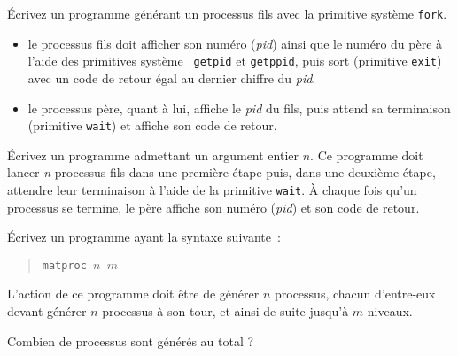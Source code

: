 %


% 


\question

Écrivez un programme générant un processus fils avec la primitive
système {\tt fork}.

\begin {itemize}
    \item le processus fils doit afficher son numéro ({\em pid}) ainsi
	que le numéro du père à l'aide des primitives système {\tt
	getpid} et {\tt getppid}, puis sort (primitive {\tt exit}) avec
	un code de retour égal au dernier chiffre du {\em pid}.

    \item le processus père, quant à lui, affiche le {\em pid} du fils,
	puis attend sa terminaison (primitive {\tt wait}) et affiche son
	code de retour.

\end {itemize}


\question

Écrivez un programme admettant un argument entier $n$. Ce programme
doit lancer {\em n} processus fils dans une
première étape puis, dans une deuxième étape, attendre leur terminaison
à l'aide de la primitive {\tt wait}.
À chaque fois qu'un processus se termine,
le père affiche son numéro ({\em pid}) et son code de retour.


\question

Écrivez un programme ayant la syntaxe suivante~:

\vspace* {-3mm}
\begin {quote}
{\tt matproc $n$ $m$}
\end {quote}

L'action de ce programme doit être de générer $n$ processus, chacun
d'entre-eux devant générer $n$ processus à son tour, et ainsi de suite
jusqu'à $m$ niveaux.

Combien de processus sont générés au total ?

\question

